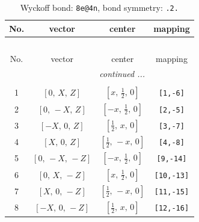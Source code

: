 \documentclass[fleqn,8pt]{jsarticle}
\begin{document}
\begin{longtable}{cccc}
\caption{Wyckoff bond: {\tt 8e@4n}, bond symmetry: {\tt .2.}}
 \\
 \hline \hline
No. & vector & center & mapping \\ \hline \endfirsthead

\multicolumn{3}{l}{\tablename\ \thetable{}} \\
 \hline \hline
No. & vector & center & mapping \\ \hline \endhead

 \hline \hline
\multicolumn{3}{r}{\footnotesize\it continued ...} \\ \endfoot

 \hline \hline
\multicolumn{3}{r}{} \\ \endlastfoot

1 & $\left[ 0,\, X,\, Z \right]$ & $\left[ x,\, \frac{1}{2},\, 0 \right]$ & {\tt [1,-6]} \\ \hline
2 & $\left[ 0,\, - X,\, Z \right]$ & $\left[ - x,\, \frac{1}{2},\, 0 \right]$ & {\tt [2,-5]} \\ \hline
3 & $\left[ - X,\, 0,\, Z \right]$ & $\left[ \frac{1}{2},\, x,\, 0 \right]$ & {\tt [3,-7]} \\ \hline
4 & $\left[ X,\, 0,\, Z \right]$ & $\left[ \frac{1}{2},\, - x,\, 0 \right]$ & {\tt [4,-8]} \\ \hline
5 & $\left[ 0,\, - X,\, - Z \right]$ & $\left[ - x,\, \frac{1}{2},\, 0 \right]$ & {\tt [9,-14]} \\ \hline
6 & $\left[ 0,\, X,\, - Z \right]$ & $\left[ x,\, \frac{1}{2},\, 0 \right]$ & {\tt [10,-13]} \\ \hline
7 & $\left[ X,\, 0,\, - Z \right]$ & $\left[ \frac{1}{2},\, - x,\, 0 \right]$ & {\tt [11,-15]} \\ \hline
8 & $\left[ - X,\, 0,\, - Z \right]$ & $\left[ \frac{1}{2},\, x,\, 0 \right]$ & {\tt [12,-16]} \\
\end{longtable}
\renewcommand{\arraystretch}{1.2}
\end{document}
